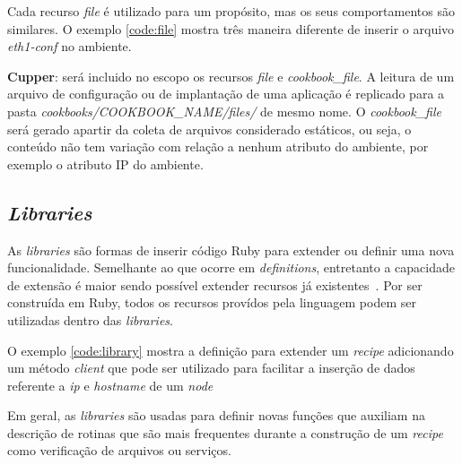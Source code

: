 Cada recurso \textit{file} é utilizado para um propósito, mas os seus comportamentos
são similares. O exemplo \ref{code:file} mostra três maneira diferente de
inserir o arquivo \textit{eth1-conf} no ambiente.

\begin{minipage}{.90\textwidth}
  \lstset{style=shell}
  
\end{minipage}

\textbf{Cupper}: será incluido no escopo os recursos \textit{file} e \textit{cookbook\_file}.
A leitura de um arquivo de configuração ou de implantação de uma aplicação 
é replicado para a pasta \textit{cookbooks/COOKBOOK\_NAME/files/} de mesmo nome.
O \textit{cookbook\_file} será gerado apartir da coleta de arquivos considerado estáticos,
ou seja, o conteúdo não tem variação com relação a nenhum atributo do ambiente,
por exemplo o atributo IP do ambiente.

\subsection{\textit{Libraries}}

As \textit{libraries} são formas de inserir código Ruby para extender ou definir
uma nova funcionalidade. Semelhante ao que ocorre em \textit{definitions}, entretanto a
capacidade de extensão é maior sendo possível extender recursos já
existentes~\cite{chefdoc:2016}. Por ser construída em Ruby, todos os
recursos provídos pela linguagem podem ser utilizadas dentro das
\textit{libraries}.

O exemplo \ref{code:library} mostra a definição para extender um
\textit{recipe} adicionando um método \textit{client} que pode ser utilizado
para facilitar a inserção de dados referente a \textit{ip} e \textit{hostname} de um
\textit{node}

\begin{minipage}{.90\textwidth}
  \lstset{style=shell}
  
\end{minipage}

Em geral, as \textit{libraries} são usadas para definir novas funções que
auxiliam na descrição de rotinas que são mais frequentes durante a
construção de um \textit{recipe} como verificação de arquivos ou serviços.


